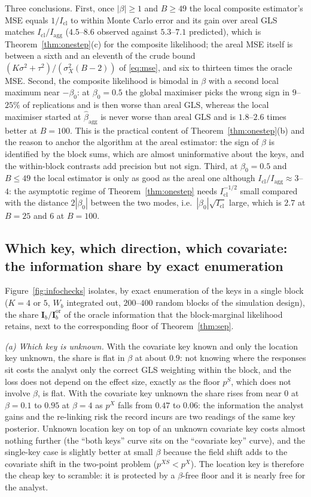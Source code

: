 \documentclass[11pt]{article}
\theoremstyle{definition}
\newcommand{\agg}{\mathrm{agg}}
\newcommand{\orc}{\mathrm{or}}
\begin{document}
Three conclusions. First, once $|\beta|\ge1$ and $B\ge49$ the local composite estimator's MSE equals $1/I_{\mathrm{cl}}$ to within Monte Carlo error and its gain over areal GLS matches $I_{\mathrm{cl}}/I_\agg$ ($4.5$--$8.6$ observed against $5.3$--$7.1$ predicted), which is Theorem~\ref{thm:onestep}(c) for the composite likelihood; the areal MSE itself is between a sixth and an eleventh of the crude bound $(K\sigma^2+\tau^2)/(\sigma_X^2(B-2))$ of \eqref{eq:mse}, and six to thirteen times the oracle MSE. Second, the composite likelihood is bimodal in $\beta$ with a second local maximum near $-\beta_0$: at $\beta_0=0.5$ the global maximiser picks the wrong sign in $9$--$25\%$ of replications and is then worse than areal GLS, whereas the local maximiser started at $\hat\beta_\agg$ is never worse than areal GLS and is $1.8$--$2.6$ times better at $B=100$. This is the practical content of Theorem~\ref{thm:onestep}(b) and the reason to anchor the algorithm at the areal estimator: the sign of $\beta$ is identified by the block sums, which are almost uninformative about the keys, and the within-block contrasts add precision but not sign. Third, at $\beta_0=0.5$ and $B\le49$ the local estimator is only as good as the areal one although $I_{\mathrm{cl}}/I_\agg\approx3$--$4$: the asymptotic regime of Theorem~\ref{thm:onestep} needs $I_{\mathrm{cl}}^{-1/2}$ small compared with the distance $2|\beta_0|$ between the two modes, i.e.\ $|\beta_0|\sqrt{I_{\mathrm{cl}}}$ large, which is $2.7$ at $B=25$ and $6$ at $B=100$.

\subsection{Which key, which direction, which covariate: the information share by exact enumeration}\label{sec:infochecks}

Figure~\ref{fig:infochecks} isolates, by exact enumeration of the keys in a single block ($K=4$ or $5$, $W_b$ integrated out, $200$--$400$ random blocks of the simulation design), the share $\mathbf I_b/\mathbf I_b^{\orc}$ of the oracle information that the block-marginal likelihood retains, next to the corresponding floor of Theorem~\ref{thm:sep}.

\emph{(a) Which key is unknown.} With the covariate key known and only the location key unknown, the share is flat in $\beta$ at about $0.9$: not knowing where the responses sit costs the analyst only the correct GLS weighting within the block, and the loss does not depend on the effect size, exactly as the floor $p^S$, which does not involve $\beta$, is flat. With the covariate key unknown the share rises from near $0$ at $\beta=0.1$ to $0.95$ at $\beta=4$ as $p^X$ falls from $0.47$ to $0.06$: the information the analyst gains and the re-linking risk the record incurs are two readings of the same key posterior. Unknown location key on top of an unknown covariate key costs almost nothing further (the ``both keys'' curve sits on the ``covariate key'' curve), and the single-key case is slightly better at small $\beta$ because the field shift adds to the covariate shift in the two-point problem ($p^{XS}<p^X$). The location key is therefore the cheap key to scramble: it is protected by a $\beta$-free floor and it is nearly free for the analyst.
\end{document}
